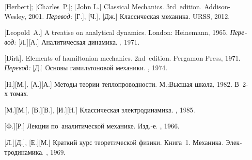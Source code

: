 \begin{thebibliography}{123}
\begin{otherlanguage}{russian}
%

[Herbert]; [Charles~P.]; [John L.] Classical Mechanics. 3rd~edition. Addison\hbox{-}Wesley, 2001. 
\emph{Перевод:} [Г.], [Ч.], [Дж.] Классическая механика. URSS, 2012. 


[Leopold~A.] A treatise on analytical dynamics.
London: Heinemann, 1965. 
\emph{Перевод:} [Л.][А.] Аналитическая динамика. \naukapublisher, 1971. 

[Dirk]. Elements of hamiltonian mechanics. 2nd~edition. Pergamon Press, 1971. 
\emph{Перевод:} [Д.] Основы гамильтоновой механики. \naukapublisher, 1974. 

[Н.][М.], [А.][А.] Методы теории теплопроводности. М.:\;Высшая школа, 1982. В~2\hbox{-}х томах.

[М.][М.], [В.][В.], [И.][Н.] Классическая электродинамика. \naukapublisher, 1985. 

[Ф.][Р.] Лекции по~аналитической механике. Изд.\hbox{-}е. \naukapublisher, 1966. 

[Л.][Д.], [Е.][М.] Краткий курс теоретической физики. Книга~1. Механика. Электродинамика. \naukapublisher, 1969. 


\end{otherlanguage}
\end{thebibliography}
